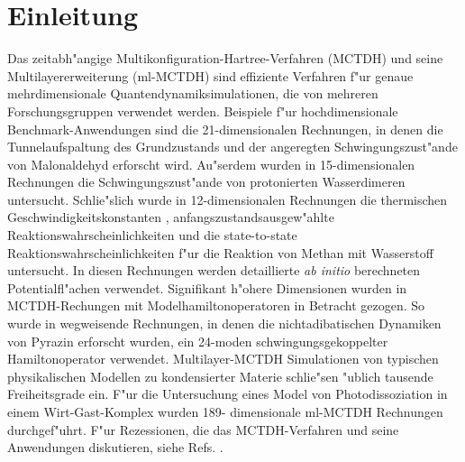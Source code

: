 \chapter{Einleitung}

Das zeitabh"angige Multikonfiguration-Hartree-Verfahren (MCTDH) 
\cite{MMC, MMC1} und seine Multilayererweiterung (ml-MCTDH)
\cite{WT3, Mreview2} 
sind effiziente Verfahren f"ur genaue mehrdimensionale Quantendynamiksimulationen,
die von mehreren Forschungsgruppen verwendet werden. 
\cite{MCTDHex1, WestPNM, MCTDHex2, W1, MCTDHex4, MCTDHex5, MCTDHex6, MCTDHex7, MCTDHex8,
MCTDHex9, MCTDHex10, MCTDHex11, MCTDHex12, MCTDHex13, MCTDHex14, MCTDHex15, MCTDHex16, MCTDHex17,MCTDHex18} 
Beispiele f"ur hochdimensionale 
Benchmark-Anwendungen sind die 21-dimensionalen Rechnungen, in denen die Tunnelaufspaltung des
Grundzustands \cite{CVM, HCVM, HaM1, MAMCTDH, HaM2, MAMCTDH2} und der angeregten \cite{HCVM, HaM1, MAMCTDH, HaM2, MAMCTDH2}
Schwingungszust"ande von Malonaldehyd erforscht wird. 
Au"serdem wurden in 15-dimen\-sio\-nalen Rechnungen die Schwingungszust"ande von protonierten 
Wasserdimeren \cite{H5O2+MCTDH, H5O2+MCTDH2, H5O2+MCTDH3, H5O2+MCTDH4, H5O2+MCTDH5} untersucht. 
Schlie"s\-lich wurde in 12-dimensionalen Rechnungen die thermischen 
Geschwindig\-keitskonstanten \cite{HM1, HM2, WWM, SM, vHNM,NvHM}, anfangszustandsausgew"ahlte Reaktionswahrscheinlichkeiten
\cite{SM02, SM04, WeM5, WeM6, WeM8} und die 
state-to-state Reaktionswahrscheinlichkeiten \cite{WeM7} f"ur die Reaktion von Methan mit Wasserstoff 
untersucht. In diesen Rechnungen werden detaillierte \textit{ab initio} berechneten
Potentialfl"achen verwendet. Signifikant h"ohere Dimensionen wurden in MCTDH-Rechungen mit 
Modelhamiltonoperatoren in Betracht gezogen. So wurde in wegweisende Rechnungen, in denen  
die nichtadibatischen Dynamiken von Pyrazin erforscht wurden, ein 24-moden 
schwingungsgekoppelter Hamiltonoperator \cite{WMC, WMC2, RWMC} verwendet. Multilayer-MCTDH Simulationen von typischen
physikalischen Modellen \cite{WT3, W1, WST, KCBWT, CTW2, WPHT} zu kondensierter Materie schlie"sen "ublich tausende Freiheitsgrade ein.
F"ur die Untersuchung eines Model von Photodissoziation in einem Wirt-Gast-Komplex wurden 189-
dimensionale ml-MCTDH Rechnungen \cite{WBRSM} durchgef"uhrt. F"ur Rezessionen, die das MCTDH-Verfahren und
seine Anwendungen diskutieren, siehe Refs. \cite{MCTDHreview, MCTDHreview2, HMreview1, MCTDHbook,Mreview2011, MCTDHreview3} .    